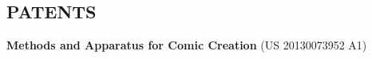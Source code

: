 \documentclass[line,margin]{res}
\begin{document}
\begin{resume}


\section{PATENTS}

\newcommand{\patent}[2] {
	\textbf{#1} (#2)
}

\patent
{Methods and Apparatus for Comic Creation}
{US 20130073952 A1}








\end{resume}
\end{document}
